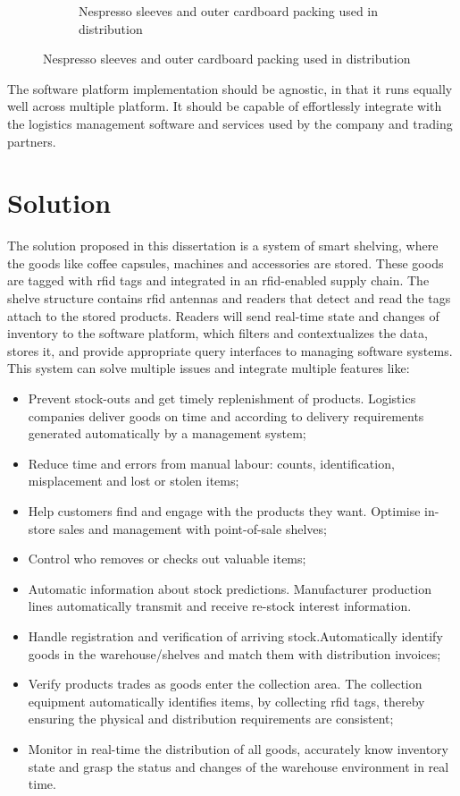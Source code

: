 \begin{figure}
\begin{subfigure}{.45\textwidth}
        \caption{Nespresso sleeves and outer cardboard packing used in distribution} 
        \label{fig:sleevepacking}
    \end{subfigure}
    \label{fig:sleeves}
\end{figure}

The software platform implementation should be agnostic, in that it runs equally well across multiple platform. It should be capable of effortlessly integrate with the logistics management software and services used by the company and trading partners.

\section{Solution}

The solution proposed in this dissertation is a system of smart shelving, where the goods like coffee capsules, machines and accessories are stored. These goods are tagged with \ac{rfid} tags and integrated in an \ac{rfid}-enabled supply chain.
The shelve structure contains \ac{rfid} antennas and readers that detect and read the tags attach to the stored products. Readers will send real-time state and changes of inventory to the software platform, which filters and contextualizes the data, stores it, and provide appropriate query interfaces to managing software systems.
This system can solve multiple issues and integrate multiple features like:

\begin{itemize}
    \item Prevent stock-outs and get timely replenishment of products. Logistics companies deliver goods on time and according to delivery requirements generated automatically by a management system;
    \item Reduce time and errors from manual labour: counts, identification, misplacement and lost or stolen items;
    \item Help customers find and engage with the products they want. Optimise in-store sales and management with point-of-sale shelves;
    \item Control who removes or checks out valuable items;
    \item Automatic information about stock predictions. Manufacturer production lines automatically transmit and receive re-stock interest information.
    \item Handle registration and verification of arriving stock.Automatically identify goods in the warehouse/shelves and match them with distribution invoices;
    \item Verify products trades as goods enter the collection area.  The collection equipment automatically identifies items, by collecting \ac{rfid} tags, thereby ensuring the physical and  distribution requirements are consistent;
    \item Monitor in real-time the distribution of all goods, accurately know inventory state and grasp the status and changes of the warehouse environment in real time.
\end{itemize}

